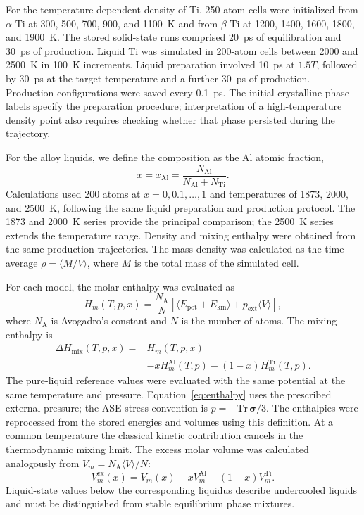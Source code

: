For the temperature-dependent density of Ti, 250-atom cells were initialized from $\alpha$-Ti at 300, 500, 700, 900, and 1100~K and from $\beta$-Ti at 1200, 1400, 1600, 1800, and 1900~K.
The stored solid-state runs comprised 20~ps of equilibration and 30~ps of production.
Liquid Ti was simulated in 200-atom cells between 2000 and 2500~K in 100~K increments.
Liquid preparation involved 10~ps at $1.5T$, followed by 30~ps at the target temperature and a further 30~ps of production.
Production configurations were saved every 0.1~ps.
The initial crystalline phase labels specify the preparation procedure; interpretation of a high-temperature density point also requires checking whether that phase persisted during the trajectory.

For the alloy liquids, we define the composition as the Al atomic fraction,
\begin{equation}
 x = x_{\mathrm{Al}} = \frac{N_{\mathrm{Al}}}{N_{\mathrm{Al}}+N_{\mathrm{Ti}}}.
\end{equation}
Calculations used 200 atoms at $x=0,0.1,\ldots,1$ and temperatures of 1873, 2000, and 2500~K, following the same liquid preparation and production protocol.
The 1873 and 2000~K series provide the principal comparison; the 2500~K series extends the temperature range.
Density and mixing enthalpy were obtained from the same production trajectories.
The mass density was calculated as the time average $\rho=\langle M/V\rangle$, where $M$ is the total mass of the simulated cell.

For each model, the molar enthalpy was evaluated as
\begin{equation}
 H_m(T,p,x)=\frac{N_{\mathrm A}}{N}
 \left[\langle E_{\mathrm{pot}}+E_{\mathrm{kin}}\rangle+
 p_{\mathrm{ext}}\langle V\rangle\right],
 \label{eq:enthalpy}
\end{equation}
where $N_{\mathrm A}$ is Avogadro's constant and $N$ is the number of atoms.
The mixing enthalpy is
\begin{align}
 \Delta H_{\mathrm{mix}}(T,p,x)={}&H_m(T,p,x)\nonumber\\
 &-xH_m^{\mathrm{Al}}(T,p)-(1-x)H_m^{\mathrm{Ti}}(T,p).
 \label{eq:mixing}
\end{align}
The pure-liquid reference values were evaluated with the same potential at the same temperature and pressure.
Equation~\eqref{eq:enthalpy} uses the prescribed external pressure; the ASE stress convention is $p=-\mathrm{Tr}\,\boldsymbol{\sigma}/3$.
The enthalpies were reprocessed from the stored energies and volumes using this definition.
At a common temperature the classical kinetic contribution cancels in the thermodynamic mixing limit.
The excess molar volume was calculated analogously from $V_m=N_{\mathrm A}\langle V\rangle/N$:
\begin{equation}
 V_m^{\mathrm{ex}}(x)=V_m(x)-xV_m^{\mathrm{Al}}-(1-x)V_m^{\mathrm{Ti}}.
\end{equation}
Liquid-state values below the corresponding liquidus describe undercooled liquids and must be distinguished from stable equilibrium phase mixtures.

